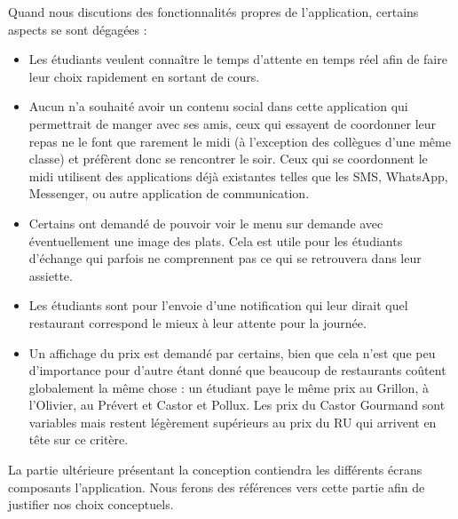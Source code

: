 Quand nous discutions des fonctionnalités propres de l’application, certains
aspects se sont dégagées : 
\begin{itemize}
\item Les étudiants veulent connaître le temps d’attente en temps réel afin de
faire leur choix rapidement en sortant de cours. 
\item Aucun n’a souhaité avoir un contenu social dans cette application qui 
permettrait de manger avec ses amis, ceux qui essayent de coordonner leur
repas ne le font que rarement le midi (à l’exception des collègues d’une 
même classe) et préfèrent donc se rencontrer le soir. Ceux qui se coordonnent
le midi utilisent des applications déjà existantes telles que les SMS,
WhatsApp, Messenger, ou autre application de communication.
\item Certains ont demandé de pouvoir voir le menu sur demande avec
éventuellement une image des plats. Cela est utile pour les étudiants d’échange
qui parfois ne comprennent pas ce qui se retrouvera dans leur assiette.
\item Les étudiants sont pour l’envoie d’une notification qui leur dirait quel
restaurant correspond le mieux à leur attente pour la journée. 
\item Un affichage du prix est demandé par certains, bien que cela n’est que
peu d’importance pour d’autre étant donné que beaucoup de restaurants coûtent
globalement la même chose : un étudiant paye le même prix au Grillon, à l’Olivier,
au Prévert et Castor et Pollux. Les prix du Castor Gourmand sont variables mais
restent légèrement supérieurs au prix du RU qui arrivent en tête sur ce critère.
\end{itemize}

La partie ultérieure présentant la conception contiendra les différents écrans
composants l'application. Nous ferons des références vers cette partie afin
de justifier nos choix conceptuels.